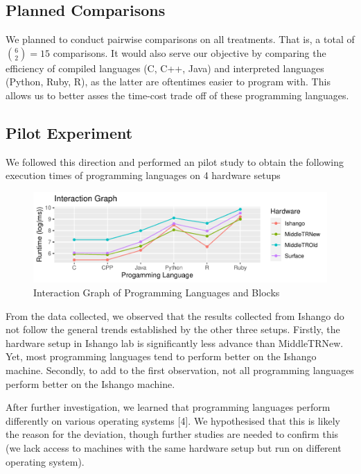 \documentclass[12pt,halfline,a4paper,]{ouparticle}
\begin{document}
\hypertarget{planned-comparisons}{%
\subsection{Planned Comparisons}\label{planned-comparisons}}

We planned to conduct pairwise comparisons on all treatments. That is, a
total of \(6 \choose 2\)\(=15\) comparisons. It would also serve our
objective by comparing the efficiency of compiled languages (C, C++,
Java) and interpreted languages (Python, Ruby, R), as the latter are
oftentimes easier to program with. This allows us to better asses the
time-cost trade off of these programming languages.

\hypertarget{pilot-experiment}{%
\subsection{Pilot Experiment}\label{pilot-experiment}}

We followed this direction and performed an pilot study to obtain the
following execution times of programming languages on 4 hardware setups

\begin{figure}[H]
\includegraphics[width=1\linewidth]{skeleton_files/figure-latex/figPilot-1} \caption{Interaction Graph of Programming Languages and Blocks}\label{fig:figPilot}
\end{figure}

From the data collected, we observed that the results collected from
Ishango do not follow the general trends established by the other three
setups. Firstly, the hardware setup in Ishango lab is significantly less
advance than MiddleTRNew. Yet, most programming languages tend to
perform better on the Ishango machine. Secondly, to add to the first
observation, not all programming languages perform better on the Ishango
machine.

After further investigation, we learned that programming languages
perform differently on various operating systems {[}4{]}. We
hypothesised that this is likely the reason for the deviation, though
further studies are needed to confirm this (we lack access to machines
with the same hardware setup but run on different operating system).
\end{document}
